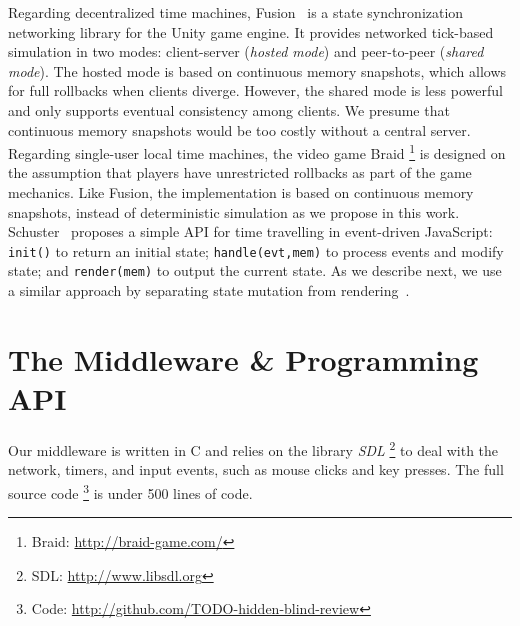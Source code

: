 \documentclass[12pt]{article}
\newcommand{\code}[1]  {\texttt{\small{#1}}}
\begin{document}
Regarding decentralized time machines, Fusion~\cite{fusion} is a state
synchronization networking library for the Unity game engine.
It provides networked tick-based simulation in two modes: client-server
(\emph{hosted mode}) and peer-to-peer (\emph{shared mode}).
The hosted mode is based on continuous memory snapshots, which allows for
full rollbacks when clients diverge.
However, the shared mode is less powerful and only supports eventual
consistency among clients.
We presume that continuous memory snapshots would be too costly without a
central server.
%
Regarding single-user local time machines, the video game Braid%
\footnote{Braid: \url{http://braid-game.com/}}
is designed on the assumption that players have unrestricted rollbacks as part
of the game mechanics.
Like Fusion, the implementation is based on continuous memory snapshots,
instead of deterministic simulation as we propose in this work.
%
Schuster~\cite{tml.js} proposes a simple API for time travelling in
event-driven JavaScript:
    \code{init()} to return an initial state;
    \code{handle(evt,mem)} to process events and modify state; and
    \code{render(mem)} to output the current state.
As we describe next, we use a similar approach by separating state mutation
from rendering~\cite{tml.alive}.

\section{The Middleware \& Programming API}
\label{sec.tml}

Our middleware is written in C and relies on the library \emph{SDL}%
\footnote{SDL: \url{http://www.libsdl.org}}
to deal with the network, timers, and input events, such as mouse clicks and
key presses.
The full source code%
\footnote{Code: \url{http://github.com/TODO-hidden-blind-review}}
is under 500 lines of code.
\end{document}
